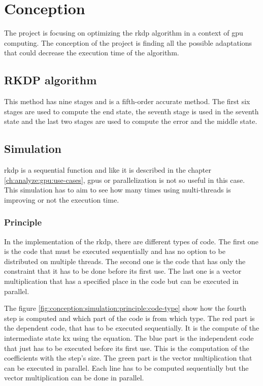 \chapter{Conception}
\label{ch:conception}

The project is focusing on optimizing the \acrlong{rkdp} algorithm
in a context of \acrshort{gpu} computing.
The conception of the project is finding all the possible adaptations that could
decrease the execution time of the algorithm.

\section{RKDP algorithm}
\label{ch:conception:rkdp}

This method has nine stages and is a fifth-order accurate method.
The first six stages are used to compute the end state, the seventh stage is used
in the seventh state and the last two stages are used to compute the error and the
middle state.

\section{Simulation}
\label{ch:conception:simulation}

\acrshort{rkdp} is a sequential function and like it is described in the chapter
\ref{ch:analyze:gpu:use-cases}, \acrshort{gpu}s or parallelization is not
so useful in this case.
This simulation has to aim to see how many times using multi-threads is improving
or not the execution time.

\subsection{Principle}
\label{ch:conception:simulation:principle}

In the implementation of the \acrshort{rkdp}, there are different types of code.
The first one is the code that must be executed sequentially and has no option
to be distributed on multiple threads.
The second one is the code that has only
the constraint that it has to be done before its first use.
The last one is a vector multiplication that has a specified place in the code
but can be executed in parallel.

The figure \ref{fig:conception:simulation:principle:code-type} show how the
fourth step is computed and which part of the code is from which type.
The red part is the dependent code, that has to be executed sequentially.
It is the compute of the intermediate state kx using the equation.
The blue part is the independent code that just has to be executed before its
first use. This is the computation of the coefficients with the step's size.
The green part is the vector multiplication that can be executed in parallel.
Each line has to be computed sequentially but the vector multiplication can be
done in parallel.

